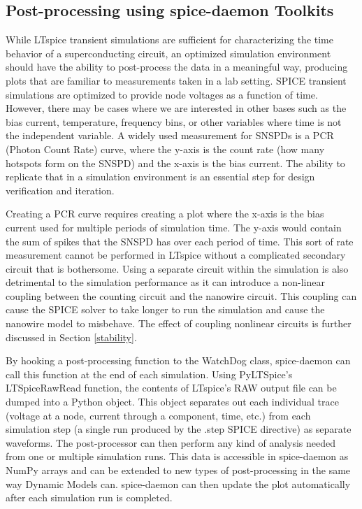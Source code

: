 \documentclass[]{article}
\newcommand{\cf}[1]{\textsf{#1}}
\begin{document}
\subsection{Post-processing using spice-daemon Toolkits}

While LTspice transient simulations are sufficient for characterizing the time behavior of a superconducting 
circuit, an optimized simulation environment should have the ability to post-process the data 
in a meaningful way, producing plots that are familiar to measurements taken in a lab setting.
SPICE transient simulations are optimized to provide
 node voltages as a function of time. However, there may be cases where we are interested in other bases such as the bias current, temperature, frequency bins, or other variables where time is not the independent variable. A widely used measurement for SNSPDs is a PCR (Photon Count Rate) curve, where
the y-axis is the count rate (how many hotspots form on the SNSPD) and the x-axis is the bias current. The ability to replicate that in a simulation environment is an essential step for
design verification and iteration.

Creating a PCR curve requires creating a plot where the x-axis is the bias current used for multiple
periods of simulation time. The y-axis would contain the sum of spikes that the SNSPD has over each period
of time. This sort of rate measurement cannot be performed in LTspice without a complicated secondary circuit
that is bothersome. Using a separate circuit within the simulation is also detrimental to the simulation
performance as it can introduce a non-linear coupling between the counting circuit and the nanowire circuit. 
This coupling can cause the SPICE solver to take longer to run the simulation and cause the nanowire model to
misbehave. The effect of coupling nonlinear circuits is further discussed in Section \ref{stability}.

By hooking a post-processing function to the \cf{WatchDog} class, spice-daemon can call this 
function at the end of each simulation. Using \cf{PyLTSpice}'s \cf{LTSpiceRawRead}
function, the contents of LTspice's RAW output file can be dumped into a Python object. This object
separates out each individual trace (voltage at a node, current through a component, time, etc.)
from each simulation step (a single run produced by the \cf{.step} SPICE directive) as separate waveforms. The 
post-processor can then perform any kind of analysis needed from one or multiple simulation runs.
This data is accessible in spice-daemon as
\cf{NumPy} arrays and can be extended to new types of post-processing in the same way Dynamic Models can. spice-daemon can then update the plot automatically after each simulation run is completed.
\end{document}

